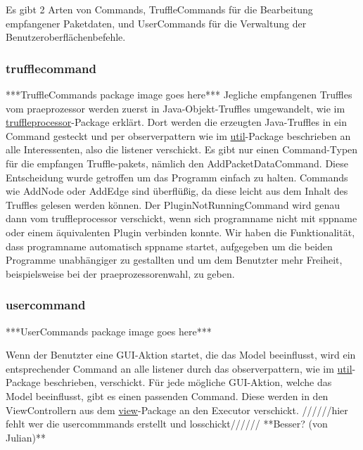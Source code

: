 Es gibt 2 Arten von Commands, TruffleCommands für die Bearbeitung empfangener
Paketdaten, und UserCommands für die Verwaltung der Benutzeroberflächenbefehle.

      \subsubsection{trufflecommand}
      \label{subsubsec:trufflecommand}
      ***TruffleCommands package image goes here***
      \newline
      \newline
      Jegliche empfangenen Truffles vom \gls{praeprozessor} werden zuerst in Java-Objekt-Truffles umgewandelt, wie
      im \hyperref[subsubsec:truffleprocessor]{truffleprocessor}-Package erklärt. Dort
      werden die erzeugten Java-Truffles in ein Command gesteckt und per \gls{observerpattern}
      wie im \hyperref[subsec:util]{util}-Package beschrieben an alle Interessenten, also die \gls{listener} verschickt.
      \newline
      \newline
      Es gibt nur einen Command-Typen für die empfangen Truffle-\glspl{paket}, nämlich den
      AddPacketDataCommand. Diese Entscheidung wurde getroffen um das Programm einfach
      zu halten. Commands wie AddNode oder AddEdge sind überflüßig, da diese leicht aus
      dem Inhalt des Truffles gelesen werden können.
      \newline
      \newline
      Der PluginNotRunningCommand wird genau dann vom truffleprocessor verschickt, wenn sich \gls{programname}
      nicht mit \gls{sppname} oder einem äquivalenten Plugin verbinden konnte. Wir
      haben die Funktionalität, dass \gls{programname} automatisch \gls{sppname} startet,
      aufgegeben um die beiden Programme unabhängiger zu gestallten und um dem Benutzter
      mehr Freiheit, beispielsweise bei der \gls{praeprozessor}enwahl, zu geben.

      \subsubsection{usercommand}
      \label{subsubsec:usercommand}
      ***UserCommands package image goes here***
      \newline
      \newline

      Wenn der Benutzter eine GUI-Aktion startet, die das Model beeinflusst,
      wird ein entsprechender Command an alle \gls{listener} durch das \gls{observerpattern}, wie im
      \hyperref[subsec:util]{util}-Package beschrieben, verschickt. Für jede mögliche
      GUI-Aktion, welche das Model beeinflusst, gibt es einen passenden Command.
      Diese werden in den ViewControllern aus dem \hyperref[subsec:view]{view}-Package
      an den Executor verschickt.
      //////hier fehlt wer die usercommmands erstellt und losschickt////// **Besser? (von Julian)**

